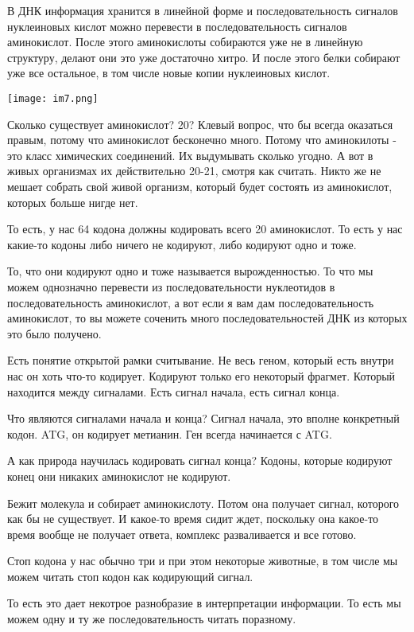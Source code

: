 В ДНК информация хранится в линейной форме и последовательность сигналов
нуклеиновых кислот можно перевести в последовательность сигналов
аминокислот. После этого аминокислоты собираются уже не в линейную структуру,
делают они это уже достаточно хитро. И после этого белки собирают
уже все остальное, в том числе новые копии нуклеиновых кислот.

  
\texttt{[image: im7.png]}

Сколько существует аминокислот?
20?
Клевый вопрос, что бы всегда оказаться правым, потому что
аминокислот бесконечно много. Потому что аминокилоты - это
класс химических соединений. Их выдумывать сколько угодно.
А вот в живых организмах их действительно 20-21, смотря как 
считать. Никто же не мешает собрать свой живой организм, 
который будет состоять из аминокислот, которых больше нигде нет. 

То есть, у нас 64 кодона должны кодировать всего 20 аминокислот. 
То есть у нас какие-то кодоны либо ничего не кодируют, 
либо кодируют одно и тоже. 

То, что они кодируют одно и тоже называется вырожденностью. 
То что мы можем однозначно перевести из последовательности 
нуклеотидов в последовательность аминокислот, 
а вот если я вам дам последовательность аминокислот, 
то вы можете соченить много 
последовательностей ДНК из которых это было получено. 

Есть понятие открытой рамки считывание. Не весь 
геном, который есть внутри нас он хоть что-то кодирует. 
Кодируют только его некоторый фрагмет. Который 
находится между сигналами. Есть сигнал начала, 
есть сигнал конца. 

Что являются сигналами начала и конца? 
Сигнал начала, это вполне конкретный кодон. ATG, он 
кодирует метианин. Ген всегда начинается с 
ATG. 

А как природа научилась кодировать сигнал конца? Кодоны, 
которые кодируют конец они никаких 
аминокислот не кодируют. 

Бежит молекула и собирает аминокислоту. Потом она получает 
сигнал, которого как бы не существует. И какое-то время сидит ждет, 
поскольку она какое-то время вообще не получает ответа, 
комплекс разваливается и все готово. 

Стоп кодона у нас обычно три и при этом некоторые животные, 
в том числе мы можем читать стоп кодон как кодирующий сигнал. 

То есть это дает некотрое разнобразие в интерпретации информации. 
То есть мы можем одну и ту же последовательность читать поразному. 

